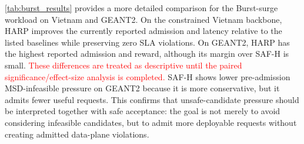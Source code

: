 \documentclass[final,5p]{elsarticle}
\newcommand{\rev}[1]{\textcolor{red}{#1}}
\begin{document}
\begin{table}[t]
\centering
\caption{Stress simulation summary: safe acceptance rate across topologies and workloads (\%).}
\label{tab:simulation_acceptance_summary}
\renewcommand{\arraystretch}{1.15}
\scriptsize
{}
\end{table}

\autoref{tab:burst_results} provides a more detailed comparison for the Burst-surge workload on Vietnam and GEANT2. On the constrained Vietnam backbone, HARP improves the currently reported admission and latency relative to the listed baselines while preserving zero SLA violations. On GEANT2, HARP has the highest reported admission and reward, although its margin over SAF-H is small. \rev{These differences are treated as descriptive until the paired significance/effect-size analysis is completed.} SAF-H shows lower pre-admission MSD-infeasible pressure on GEANT2 because it is more conservative, but it admits fewer useful requests. This confirms that unsafe-candidate pressure should be interpreted together with safe acceptance: the goal is not merely to avoid considering infeasible candidates, but to admit more deployable requests without creating admitted data-plane violations.
\end{document}
